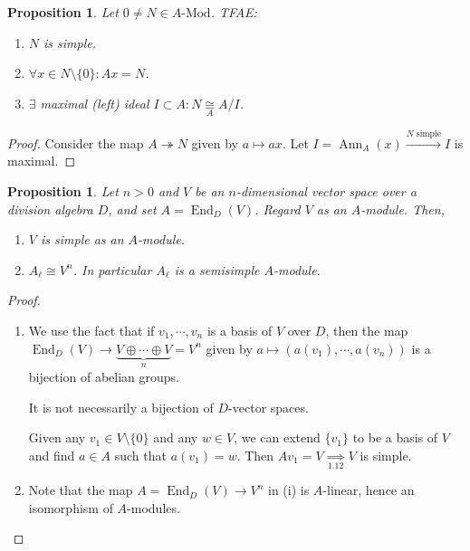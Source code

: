 \documentclass{article}
\theoremstyle{definition}
\theoremstyle{plain}
\newtheorem{proposition}[theorem]{Proposition}
\theoremstyle{remark}
\begin{document}
    \begin{proposition}
        Let \(0\neq N \in A\text{-Mod}\). TFAE:

        \begin{enumerate}[label=\roman*)]
            \item \(N\) is simple.
            \item \(\forall x\in N \setminus \{ 0 \} : Ax = N\).
            \item \(\exists \) maximal (left) ideal \(I \subset A : N \underset{A}{\cong} A / I\). 
        \end{enumerate} 
    \end{proposition}

    \begin{proof}
        Consider the map \(A \twoheadrightarrow N\) given by \(a \mapsto ax\). Let \(I = \operatorname{Ann}_A(x) \xrightarrow{N \text{ simple}} I\) is maximal.
    \end{proof}

    \begin{proposition}
        Let \(n > 0\) and \(V\) be an \(n\)-dimensional vector space over a division algebra \(D\), and set \(A = \operatorname{End}_D(V)\). Regard \(V\) as an \(A\)-module. Then,

        \begin{enumerate}[label=\roman*)]
            \item \(V\) is simple as an \(A\)-module.
            \item \(A_\ell \cong V^n\). In particular \(A_\ell\) is a semisimple \(A\)-module.
        \end{enumerate} 
    \end{proposition}

    \begin{proof}
        \begin{enumerate}[label=\roman*)]
            \item We use the fact that if \(v_1 , \cdots , v_n\) is a basis of \(V\) over \(D\), then the map \(\operatorname{End}_D (V) \to \underbrace{V \oplus \cdots \oplus V}_{n} = V^n\) given by \(a \mapsto (a(v_1), \cdots , a(v_n))\) is a bijection of abelian groups.
            
            It is not necessarily a bijection of \(D\)-vector spaces.
            
            Given any \(v_1 \in V \setminus \{ 0 \} \) and any \(w\in V\), we can extend \(\{ v_1 \}\) to be a basis of \(V\) and find \(a\in A\) such that \(a(v_1) = w\). Then \(Av_1 = V \underset{1.12}{\implies} V\) is simple.

            \item Note that the map \(A = \operatorname{End}_D(V) \to V^n\) in (i) is \(A\)-linear, hence an isomorphism of \(A\)-modules.
        \end{enumerate} 
    \end{proof}
\end{document}
